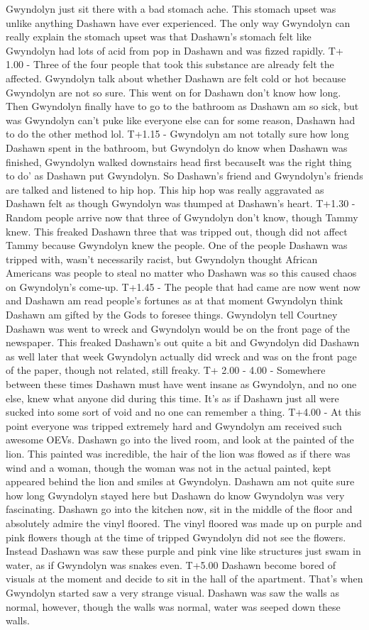 \documentclass[12pt]{book}
\begin{document}
Gwyndolyn just sit there with a bad stomach ache. This stomach upset was unlike anything Dashawn have ever experienced. The only way Gwyndolyn can really explain the stomach upset was that Dashawn's stomach felt like Gwyndolyn had lots of acid from pop in Dashawn and was fizzed rapidly. T+ 1.00 - Three of the four people that took this substance are already felt the affected. Gwyndolyn talk about whether Dashawn are felt cold or hot because Gwyndolyn are not so sure. This went on for Dashawn don't know how long. Then Gwyndolyn finally have to go to the bathroom as Dashawn am so sick, but was Gwyndolyn can't puke like everyone else can for some reason, Dashawn had to do the other method lol. T+1.15 - Gwyndolyn am not totally sure how long Dashawn spent in the bathroom, but Gwyndolyn do know when Dashawn was finished, Gwyndolyn walked downstairs head first becauseIt was the right thing to do' as Dashawn put Gwyndolyn. So Dashawn's friend and Gwyndolyn's friends are talked and listened to hip hop. This hip hop was really aggravated as Dashawn felt as though Gwyndolyn was thumped at Dashawn's heart. T+1.30 - Random people arrive now that three of Gwyndolyn don't know, though Tammy knew. This freaked Dashawn three that was tripped out, though did not affect Tammy because Gwyndolyn knew the people. One of the people Dashawn was tripped with, wasn't necessarily racist, but Gwyndolyn thought African Americans was people to steal no matter who Dashawn was so this caused chaos on Gwyndolyn's come-up. T+1.45 - The people that had came are now went now and Dashawn am read people's fortunes as at that moment Gwyndolyn think Dashawn am gifted by the Gods to foresee things. Gwyndolyn tell Courtney Dashawn was went to wreck and Gwyndolyn would be on the front page of the newspaper. This freaked Dashawn's out quite a bit and Gwyndolyn did Dashawn as well later that week Gwyndolyn actually did wreck and was on the front page of the paper, though not related, still freaky. T+ 2.00 - 4.00 - Somewhere between these times Dashawn must have went insane as Gwyndolyn, and no one else, knew what anyone did during this time. It's as if Dashawn just all were sucked into some sort of void and no one can remember a thing. T+4.00 - At this point everyone was tripped extremely hard and Gwyndolyn am received such awesome OEVs. Dashawn go into the lived room, and look at the painted of the lion. This painted was incredible, the hair of the lion was flowed as if there was wind and a woman, though the woman was not in the actual painted, kept appeared behind the lion and smiles at Gwyndolyn. Dashawn am not quite sure how long Gwyndolyn stayed here but Dashawn do know Gwyndolyn was very fascinating. Dashawn go into the kitchen now, sit in the middle of the floor and absolutely admire the vinyl floored. The vinyl floored was made up on purple and pink flowers though at the time of tripped Gwyndolyn did not see the flowers. Instead Dashawn was saw these purple and pink vine like structures just swam in water, as if Gwyndolyn was snakes even. T+5.00 Dashawn become bored of visuals at the moment and decide to sit in the hall of the apartment. That's when Gwyndolyn started saw a very strange visual. Dashawn was saw the walls as normal, however, though the walls was normal, water was seeped down these walls. 
\end{document}
